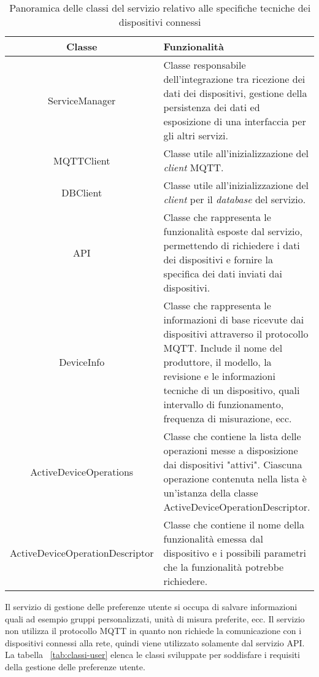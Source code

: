 \begin{table}[H]
\caption{Panoramica delle classi del servizio relativo alle specifiche tecniche dei dispositivi connessi}
\label{tab:classi-info}
\begin{tabularx}{\linewidth}{|c|X|}
\hline
\textbf{Classe} & \textbf{Funzionalità} \\
\hline
ServiceManager & Classe responsabile dell'integrazione tra ricezione dei dati dei dispositivi, gestione della persistenza dei dati ed esposizione di una interfaccia per gli altri servizi. \\
\hline
MQTTClient & Classe utile all'inizializzazione del \emph{client} MQTT. \\
\hline
DBClient & Classe utile all'inizializzazione del \emph{client} per il \emph{database} del servizio. \\
\hline
API & Classe che rappresenta le funzionalità esposte dal servizio, permettendo di richiedere i dati dei dispositivi e fornire la specifica dei dati inviati dai dispositivi. \\
\hline
DeviceInfo & Classe che rappresenta le informazioni di base ricevute dai dispositivi attraverso il protocollo MQTT. Include il nome del produttore, il modello, la revisione e le informazioni tecniche di un dispositivo, quali intervallo di funzionamento, frequenza di misurazione, ecc. \\
\hline
ActiveDeviceOperations & Classe che contiene la lista delle operazioni messe a disposizione dai dispositivi "attivi". Ciascuna operazione contenuta nella lista è un'istanza della classe ActiveDeviceOperationDescriptor. \\
\hline
ActiveDeviceOperationDescriptor & Classe che contiene il nome della funzionalità emessa dal dispositivo e i possibili parametri che la funzionalità potrebbe richiedere. \\
\hline
\end{tabularx}
\end{table}


Il servizio di gestione delle preferenze utente si occupa di salvare informazioni quali ad esempio gruppi personalizzati, unità di misura preferite, ecc.
Il servizio non utilizza il protocollo MQTT in quanto non richiede la comunicazione con i dispositivi connessi alla rete, quindi viene utilizzato solamente dal servizio API.
La tabella ~\ref{tab:classi-user} elenca le classi sviluppate per soddisfare i requisiti della gestione delle preferenze utente.


